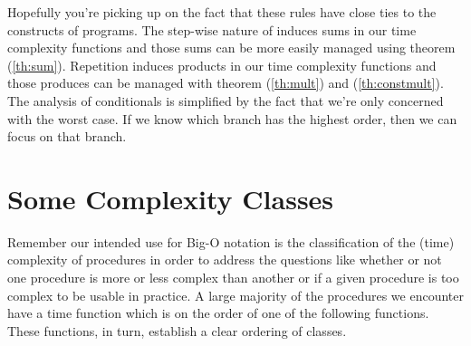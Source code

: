 \documentclass[]{tufte-handout}
\begin{document}
Hopefully you're picking up on the fact that these rules have close ties to the constructs of programs. The step-wise nature of induces sums in our time complexity functions and those sums can be more easily managed using theorem (\ref{th:sum}). Repetition induces products in our time complexity functions and those produces can be managed with theorem (\ref{th:mult}) and (\ref{th:constmult}). The analysis of conditionals is simplified by the fact that we're only concerned with the worst case. If we know which branch has the highest order, then we can focus on that branch. 

\section{Some Complexity Classes}

Remember our intended use for Big-O notation is the classification of the (time) complexity of procedures in order to address the questions like whether or not one procedure is more or less complex than another or if a given procedure is too complex to be usable in practice. A large majority of the procedures we encounter have a time function which is on the order of one of the following functions. These functions, in turn, establish a clear ordering of classes.
\end{document}
